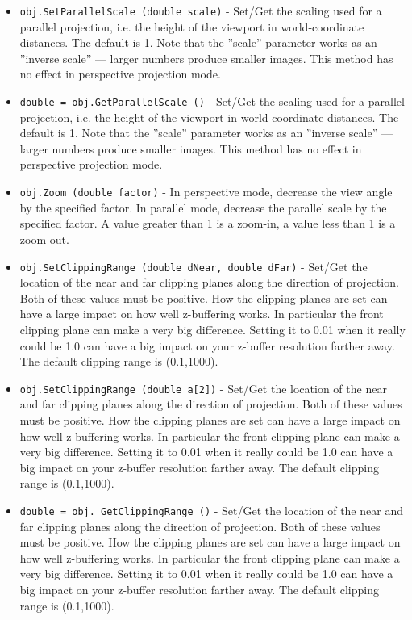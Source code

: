 \begin{itemize}
\item  \verb|obj.SetParallelScale (double scale)| -  Set/Get the scaling used for a parallel projection, i.e. the height
 of the viewport in world-coordinate distances. The default is 1.
 Note that the ''scale'' parameter works as an ''inverse scale'' ---
 larger numbers produce smaller images.
 This method has no effect in perspective projection mode.

\item  \verb|double = obj.GetParallelScale ()| -  Set/Get the scaling used for a parallel projection, i.e. the height
 of the viewport in world-coordinate distances. The default is 1.
 Note that the ''scale'' parameter works as an ''inverse scale'' ---
 larger numbers produce smaller images.
 This method has no effect in perspective projection mode.

\item  \verb|obj.Zoom (double factor)| -  In perspective mode, decrease the view angle by the specified factor.
 In parallel mode, decrease the parallel scale by the specified factor.
 A value greater than 1 is a zoom-in, a value less than 1 is a zoom-out.

\item  \verb|obj.SetClippingRange (double dNear, double dFar)| -  Set/Get the location of the near and far clipping planes along the
 direction of projection.  Both of these values must be positive.
 How the clipping planes are set can have a large impact on how 
 well z-buffering works.  In particular the front clipping
 plane can make a very big difference. Setting it to 0.01 when it
 really could be 1.0 can have a big impact on your z-buffer resolution
 farther away.  The default clipping range is (0.1,1000).

\item  \verb|obj.SetClippingRange (double a[2])| -  Set/Get the location of the near and far clipping planes along the
 direction of projection.  Both of these values must be positive.
 How the clipping planes are set can have a large impact on how 
 well z-buffering works.  In particular the front clipping
 plane can make a very big difference. Setting it to 0.01 when it
 really could be 1.0 can have a big impact on your z-buffer resolution
 farther away.  The default clipping range is (0.1,1000).

\item  \verb|double = obj. GetClippingRange ()| -  Set/Get the location of the near and far clipping planes along the
 direction of projection.  Both of these values must be positive.
 How the clipping planes are set can have a large impact on how 
 well z-buffering works.  In particular the front clipping
 plane can make a very big difference. Setting it to 0.01 when it
 really could be 1.0 can have a big impact on your z-buffer resolution
 farther away.  The default clipping range is (0.1,1000).


\end{itemize}
